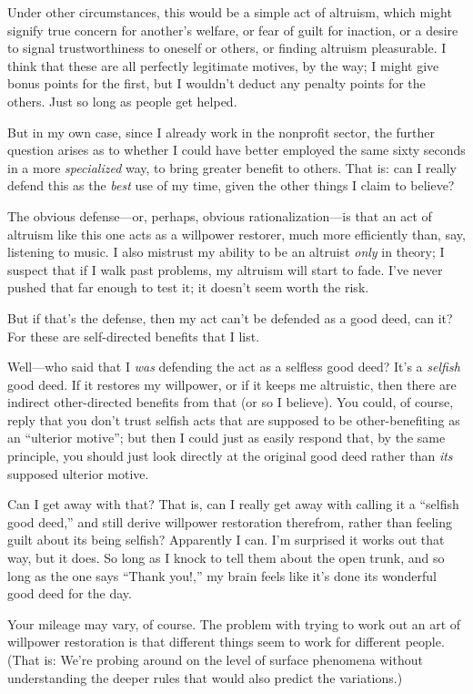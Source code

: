 {
 Under other circumstances, this would be a simple act of altruism,
which might signify true concern for another's welfare,
or fear of guilt for inaction, or a desire to signal trustworthiness to
oneself or others, or finding altruism pleasurable. I think that these
are all perfectly legitimate motives, by the way; I might give bonus
points for the first, but I wouldn't deduct any penalty
points for the others. Just so long as people get helped.}

{
 But in my own case, since I already work in the nonprofit sector,
the further question arises as to whether I could have better employed
the same sixty seconds in a more \textit{specialized} way, to bring
greater benefit to others. That is: can I really defend this as the
\textit{best} use of my time, given the other things I claim to
believe?}

{
 The obvious defense---or, perhaps, obvious rationalization---is
that an act of altruism like this one acts as a willpower restorer,
much more efficiently than, say, listening to music. I also mistrust my
ability to be an altruist \textit{only} in theory; I suspect that if I
walk past problems, my altruism will start to fade.
I've never pushed that far enough to test it; it
doesn't seem worth the risk.}

{
 But if that's the defense, then my act
can't be defended as a good deed, can it? For these are
self-directed benefits that I list.}

{
 Well---who said that I \textit{was} defending the act as a
selfless good deed? It's a \textit{selfish} good deed.
If it restores my willpower, or if it keeps me altruistic, then there
are indirect other-directed benefits from that (or so I believe). You
could, of course, reply that you don't trust selfish
acts that are supposed to be other-benefiting as an
``ulterior motive''; but then I
could just as easily respond that, by the same principle, you should
just look directly at the original good deed rather than \textit{its}
supposed ulterior motive.}

{
 Can I get away with that? That is, can I really get away with
calling it a ``selfish good deed,''
and still derive willpower restoration therefrom, rather than feeling
guilt about its being selfish? Apparently I can. I'm
surprised it works out that way, but it does. So long as I knock to
tell them about the open trunk, and so long as the one says
``Thank you!,'' my brain feels like
it's done its wonderful good deed for the day.}

{
 Your mileage may vary, of course. The problem with trying to work
out an art of willpower restoration is that different things seem to
work for different people. (That is: We're probing
around on the level of surface phenomena without understanding the
deeper rules that would also predict the variations.)}

